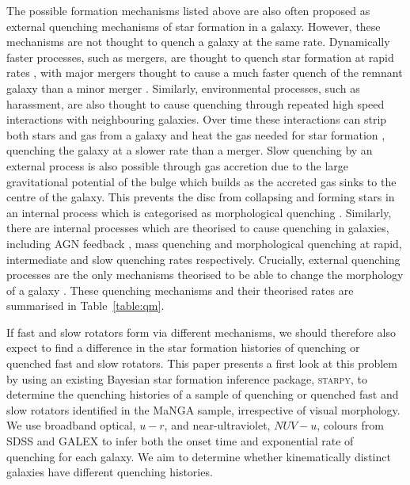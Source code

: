 \documentclass[useAMS,usenatbib]{mn2e}
\begin{document}
The possible formation mechanisms listed above are also often proposed as external quenching mechanisms of star formation in a galaxy. However, these mechanisms are not thought to quench a galaxy at the same rate. Dynamically faster processes, such as mergers, are thought to quench star formation at rapid rates \citep{hopkins08a, snyder11, hayward14}, with major mergers thought to cause a much faster quench of the remnant galaxy than a minor merger \citep{lotz08b, lotz11}. Similarly, environmental processes, such as harassment, are also thought to cause quenching through repeated high speed interactions with neighbouring galaxies. Over time these interactions can strip both stars and gas from a galaxy and heat the gas needed for star formation \citep{knebe06, aguerri09}, quenching the galaxy at a slower rate than a merger. Slow quenching by an external process is also possible through gas accretion due to the large gravitational potential of the bulge which builds as the accreted gas sinks to the centre of the galaxy. This prevents the disc from collapsing and forming stars in an internal process which is categorised as morphological quenching \citep{martig09, fang13}. Similarly, there are internal processes which are theorised to cause quenching in galaxies, including AGN feedback \citep{croton06, somerville08}, mass quenching \citep{peng10, peng12} and morphological quenching \citep[e.g. due to a galactic bar,][]{zurita04, sheth05} at rapid, intermediate and slow quenching rates respectively. Crucially, external quenching processes are the only mechanisms theorised to be able to change the morphology of a galaxy \citep[see Section 1 of][for a more detailed introduction to possible quenching mehanisms]{smethurst17}. These quenching mechanisms and their theorised rates are summarised in Table~\ref{table:qm}.

If fast and slow rotators form via different mechanisms, we should therefore also expect to find a difference in the star formation histories of quenching or quenched fast and slow rotators. This paper presents a first look at this problem by using an existing Bayesian star formation inference package, \textsc{starpy}, to determine the quenching histories of a sample of quenching or quenched fast and slow rotators identified in the MaNGA sample, irrespective of visual morphology. We use broadband optical, $u-r$, and near-ultraviolet, $NUV-u$, colours from SDSS and GALEX to infer both the onset time and exponential rate of quenching for each galaxy. We aim to determine whether kinematically distinct galaxies have different quenching histories. 
\end{document}
